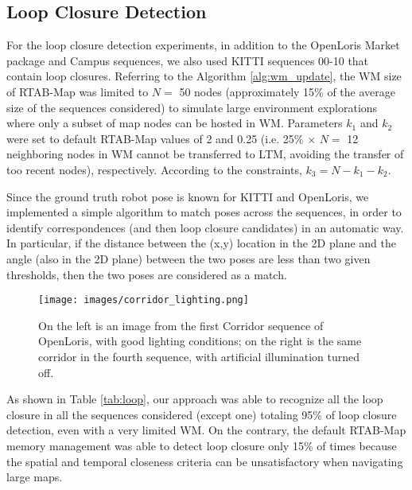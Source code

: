 \documentclass[letterpaper, 10 pt, conference]{ieeeconf}  %
\begin{document}
\subsection{Loop Closure Detection}
For the loop closure detection experiments, in addition to the OpenLoris Market package and Campus sequences, we also used KITTI sequences 00-10 that contain loop closures. Referring to the Algorithm \ref{alg:wm_update}, the WM size of RTAB-Map was limited to $N=$ 50 nodes (approximately 15\% of the average size of the sequences considered) to simulate large environment explorations where only a subset of map nodes can be hosted in WM. Parameters $k_1$ and $k_2$ were set to default RTAB-Map values of 2 and 0.25 (i.e. 25\% $ \times$ $N = $ 12 neighboring nodes in WM cannot be transferred to LTM, avoiding the transfer of too recent nodes), respectively. According to the constraints, $k_3 = N - k_1 - k_2$.



Since the ground truth robot pose is known for KITTI and OpenLoris, we implemented a simple algorithm to match poses across the sequences, in order to identify correspondences (and then loop closure candidates) in an automatic way. In particular, if the distance between the (x,y) location in the 2D plane and the angle (also in the 2D plane) between the two poses are less than two given thresholds, then the two poses are considered as a match. 



\begin{figure}[b]
\centering
\texttt{[image: images/corridor\_lighting.png]}
\caption{On the left is an image from the first Corridor sequence of OpenLoris, with good lighting conditions; on the right is the same corridor in the fourth sequence, with artificial illumination turned off.}
\label{fig:corridor_openloris}
\end{figure}

As shown in Table \ref{tab:loop}, our approach was able to recognize all the loop closure in all the sequences considered (except one) totaling 95\% of loop closure detection, even with a very limited WM. On the contrary, the default RTAB-Map memory management was able to detect loop closure only 15\% of times because the spatial and temporal closeness criteria can be unsatisfactory when navigating large maps. 
\end{document}
